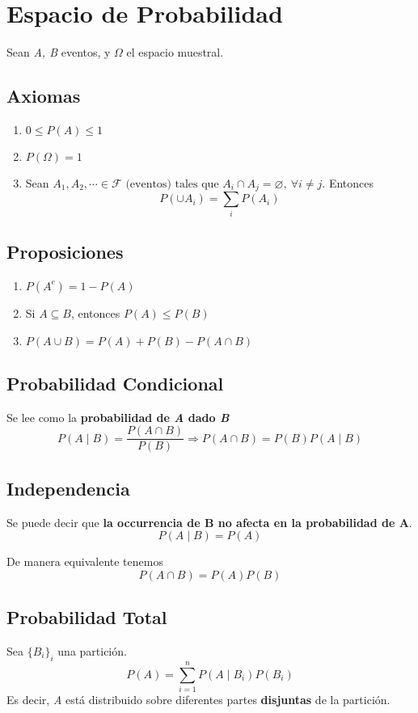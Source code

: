 \chapter{Espacio de Probabilidad}
Sean \textit{A, B} eventos, y $\Omega$ el espacio muestral.
\section{Axiomas}
\begin{enumerate}
  \item $0 \le P(A) \le 1$
  \item $P(\Omega) = 1$
  \item Sean $A_1, A_2, \cdots \in \mathcal F \text{ (eventos) tales que } A_i \cap A_j = \varnothing, ~\forall i \neq j.$ Entonces $$P(\cup A_i) = \sum_i P(A_i)$$
\end{enumerate}

\section{Proposiciones}

\begin{enumerate}
  \item $P(A^c) = 1 - P(A)$
  \item Si $A \subseteq B$, entonces $P(A) \le P(B)$
  \item $P(A \cup B) = P(A) + P(B) - P(A \cap B)$
\end{enumerate}

\section{Probabilidad Condicional}

Se lee como la \textbf{probabilidad de \textit A dado \textit B}
$$P(A \mid B) = \frac{P(A \cap B)}{P(B)} \Longrightarrow P(A \cap B) = P(B)P(A \mid B)$$

\section{Independencia}
Se puede decir que \textbf{la occurrencia de B no afecta en la probabilidad de A}.
$$P(A \mid B) = P(A)$$

\noindent De manera equivalente tenemos $$P(A \cap B) = P(A)P(B)$$

\section{Probabilidad Total}
Sea $\{B_i\}_i$ una partición.
$$P(A) = \sum_{i = 1}^n P(A \mid B_i)P(B_i)$$
\noindent Es decir, \textit A está distribuido sobre diferentes partes \textbf{disjuntas} de la partición.

